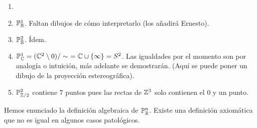     \begin{example}
        \begin{enumerate}
            \item []
            \item $\mathbb{P}^1_{\mathbb{R}}$. Faltan dibujos de cómo interpretarlo (los añadirá Ernesto).
            \item $\mathbb{P}^2_{\mathbb{R}}$. Ídem.
            \item $\mathbb{P}^1_{\mathbb{C}} = (\mathbb{C}^2 \setminus {0})/\sim \ = \mathbb{C} \cup \left\{\infty\right\} = S^2$. Las igualdades
            por el momento son por analogía o intuición, más adelante se demostrarán. (Aquí se puede poner un
            dibujo de la proyección estereográfica).
            \item $\mathbb{P}^2_{\mathbb{Z} / 2}$ contiene $7$ puntos pues las rectas de $\mathbb{Z}^3$ solo contienen el $0$ y un punto.
        \end{enumerate}
    \end{example}
    \begin{obs}
        Hemos enunciado la definición algebraica de $\mathbb{P}_{\mathbb{R}}^{n}$. Existe una definición axiomática que no 
        es igual en algunos casos patológicos.
    \end{obs}
